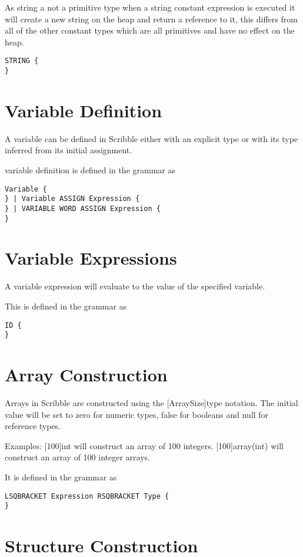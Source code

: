 \documentclass[]{final_report}
\begin{document}
As string a not a primitive type when a string constant expression is executed it will create a new string on the heap and return a reference to it, this differs from all of the other constant types which are all primitives and have no effect on the heap.

\begin{verbatim}
STRING {
}
\end{verbatim}

\section{Variable Definition}

A variable can be defined in Scribble either with an explicit type or with its type inferred from its initial assignment.

variable definition is defined in the grammar as
\begin{verbatim}
Variable {
} | Variable ASSIGN Expression {
} | VARIABLE WORD ASSIGN Expression {
}
\end{verbatim}

\section{Variable Expressions}

A variable expression will evaluate to the value of the specified variable.

This is defined in the grammar as \begin{verbatim}
ID {
}
\end{verbatim}

\section{Array Construction}

Arrays in Scribble are constructed using the [ArraySize]type notation. The initial value will be set to zero for numeric types, false for booleans and null for reference types.

Examples:
[100]int will construct an array of 100 integers.
[100]array(int) will construct an array of 100 integer arrays.

It is defined in the grammar as
\begin{verbatim}
LSQBRACKET Expression RSQBRACKET Type {
}
\end{verbatim}

\section{Structure Construction}
\end{document}
